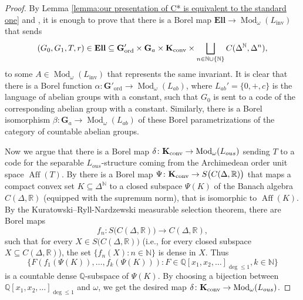 \documentclass[12pt]{amsart}
\DeclareMathOperator{\Mod}{Mod}
\DeclareMathOperator{\Ell}{\mathbf{Ell}}
\DeclareMathOperator{\Aff}{Aff}
\DeclareMathOperator{\inv}{inv}
\newcommand{\Lang}{L}
\newcommand{\Kconv}{\mathbf{K}_{\textnormal{conv}}}
\begin{document}
\begin{proof}
    By Lemma \ref{lemma:our presentation of C* is equivalent to the standard one} and \cite[Lemma 3.15]{Farahturbulence2014}, it is enough to prove that there is a Borel map $\mathbf{Ell} \rightarrow \Mod_\omega(\Lang_{\inv})$ that sends
    \[
        (G_0,G_1,T,r) \in \mathbf{\Ell} \subseteq \mathbf{G}'_{\operatorname{ord}} \times \mathbf{G}_a \times \Kconv \times \bigsqcup_{n \in \mathbb{N} \cup \{ \mathbb{N} \}} C(\Delta^{\mathbb{N}}, \Delta^n),
    \]
    to some $A \in \Mod_\omega(\Lang_{\inv})$ that represents the same invariant. 
    It is clear that there is a Borel function $\alpha \colon \mathbf{G}'_{\operatorname{ord}} \to \Mod_{\omega}(L_{ab})$, where $L_{ab}' = \{0, +, c\}$ is the language of abelian groups with a constant, such that $G_0$ is sent to a code of the corresponding abelian group with a constant. 
    Similarly, there is a Borel isomorphism $\beta \colon \mathbf{G}_a \to \Mod_{\omega}(L_{ab})$ of these Borel parametrizations of the category of countable abelian groups.

    Now we argue that there is a Borel map $\delta \colon \Kconv \to \Mod_{\omega}(L_{ous})$ sending $T$ to a code for the separable $L_{ous}$-structure coming from the Archimedean order unit space $\Aff(T)$. 
    By \cite[Lemma 4.4]{Farahturbulence2014} there is a Borel map $\Psi \colon \Kconv \to S\bigl(C(\Delta, \mathbb{R})\bigr)$ that maps a compact convex set $K \subseteq \Delta^{\mathbb{N}}$ to a closed subspace $\Psi(K)$ of the Banach algebra $C(\Delta, \mathbb{R})$ (equipped with the supremum norm), that is isomorphic to $\Aff(K)$. 
    By the Kuratowski–Ryll-Nardzewski measurable selection theorem, there are Borel maps
    \[ f_n \colon S\bigl(C(\Delta, \mathbb{R})\bigr) \to C(\Delta, \mathbb{R}), \]
    such that for every $X \in S\bigl(C(\Delta, \mathbb{R})\bigr)$ (i.e., for every closed subspace $X \subseteq C(\Delta, \mathbb{R})$), the set $\{ f_n(X) \colon n \in \mathbb{N} \}$ is dense in $X$.
    Thus 
    \[ \{ F(f_1(\Psi(K)), \dots, f_k(\Psi(K))) \colon F \in \mathbb{Q}[x_1, x_2, \dots]_{\deg \leq 1} , k \in \mathbb{N} \}\] is a countable dense $\mathbb{Q}$-subspace of $\Psi(K)$. 
    By choosing a bijection between $\mathbb{Q}[x_1, x_2, \dots]_{\deg \leq 1}$ and $\omega$, we get the desired map $\delta \colon \Kconv \to \Mod_{\omega}(L_{ous})$.
    

\end{proof}
\end{document}
